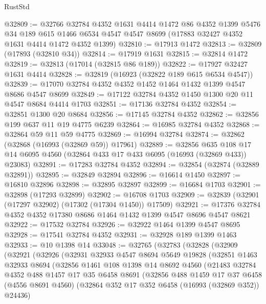 \begin{lexlean}{RustStd}
\begin{coremodule}
{\begin{coremodule}
{{{{{{{{{{{{{{{{{{{{{{{{{{{{{{{{{{{{{{{{{{{{{{{{{{{{{{{@32809 := @32766
    @32784
    @4352
    @1631
    @4414
    @1472
    @86
    @4352
    @1399
    @5476
    @34
    @189
    @615
    @1466
    @6534
    @4547
    @4547
    @8699
    (@17883 @32427 @4352 @1631 @4414 @1472 @4352 @1399)
@32810 := @17913 @1472
@32813 := @32809 (@17893 (@32810 @34))
@32814 := @17919 @1631
@32815 := @32814 @1472
@32819 := @32813 (@17014 (@32815 @86 @189))
@32822 := @17927 @32427 @1631 @4414
@32828 := @32819 (@16923 (@32822 @189 @615 @6534 @4547))
@32839 := @17070 @32784 @4352 @4352 @1452 @1464 @1432 @1399 @4547 @8686 @4547 @8699
@32849 := @17122 @32784 @4352 @1450 @1300 @20 @11 @4547 @8684 @4414 @1703
@32851 := @17136 @32784 @4352
@32854 := @32851 @1300 @20 @8684
@32856 := @17145 @32784 @4352
@32862 := @32856 @199 @637 @11 @19 @4775 @6239
@32864 := @16985 @32784 @4352
@32868 := @32864 @59 @11 @59 @4775
@32869 := @16994 @32784
@32874 := @32862 (@32868 (@16993 (@32869 @59)) @17961)
@32889 := @32856
    @635
    @108
    @17
    @14
    @6095
    @4560
    (@32864 @433 @17 @433 @6095 (@16993 (@32869 @433)) @23083)
@32891 := @17283 @32784 @4352
@32894 := @32854 (@32874 (@32889 @32891))
@32895 := @32849 @32894
@32896 := @16614 @1450
@32897 := @16810 @32896
@32898 := @32895 @32897
@32899 := @16684 @1703
@32901 := @32898 (@17293 @32899)
@32902 := @16708 @1703
@32909 := @32839 (@32901 (@17297 @32902) (@17302 (@17304 @1450)) @17509)
@32921 := @17376 @32784 @4352 @4352 @17380 @8686 @1464 @1432 @1399 @4547 @8696 @4547 @8621
@32922 := @17532 @32784
@32926 := @32922 @1464 @1399 @4547 @8695
@32928 := @17541 @32784 @4352
@32931 := @32928 @189 @1399 @1463
@32933 := @10 @1398 @14
@33048 := @32765
    (@32783
      (@32828
        (@32909
          (@32921
            (@32926
              (@32931
                @32933
                @4547
                @8694
                @5649
                @19828
                (@32851
                  @1463
                  @32933
                  @8694
                  (@32856
                    @1461
                    @108
                    @1398
                    @14
                    @8692
                    @4560
                    (@21483
                      @32784
                      @4352
                      @488
                      @1457
                      @17
                      @35
                      @6458
                      @8691
                      (@32856
                        @488
                        @1459
                        @17
                        @37
                        @6458
                        (@4556 @8691 @4560)
                        (@32864 @352 @17 @352 @6458 (@16993 (@32869 @352)) @24436)
}}}}}}}}}}}}}}}}}}}}}}}}}}}}}}}}}}}}}}}}}}}}}}}}}}}}}}}
\end{coremodule}}
\end{coremodule}
\end{lexlean}
